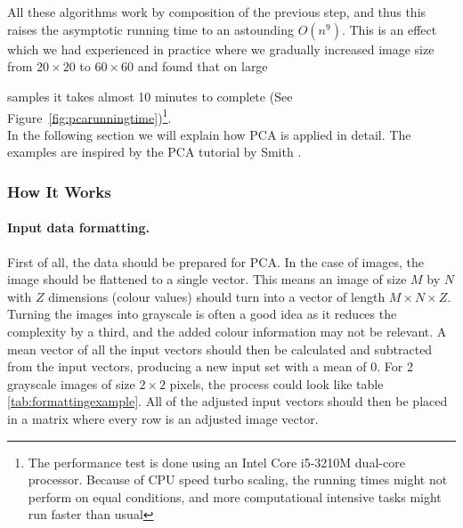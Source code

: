\begin{minipage}{\linewidth}
\centering
{}
\label{fig:pcarunningtime}
\end{minipage}\\\\

All these algorithms work by composition of the previous step, and thus this raises the asymptotic running time to an astounding $\mathit{O}(n^9)$.
This is an effect which we had experienced in practice where we gradually increased image size from $20 \times 20$ to $60 \times 60$ and found that on large

samples it takes almost 10 minutes to complete (See Figure~\ref{fig:pcarunningtime})\footnote{The performance test is done using an Intel Core i5-3210M dual-core processor. Because of CPU speed turbo scaling, the running times might not perform on equal conditions, and more computational intensive tasks might run faster than usual}.\\


In the following section we will explain how PCA is applied in detail. The examples are inspired by the PCA tutorial by Smith \cite{smith2002tutorial}.

\subsubsection{How It Works}
\label{ssub:HowItWorks}
\paragraph{Input data formatting.}
First of all, the data should be prepared for PCA.
In the case of images, the image should be flattened to a single vector.
This means an image of size $M$ by $N$ with $Z$ dimensions (colour values) should turn into a vector of length $M\times N\times Z$.
Turning the images into grayscale is often a good idea as it reduces the complexity by a third, and the added colour information may not be relevant.
A mean vector of all the input vectors should then be calculated and subtracted from the input vectors, producing a new input set with a mean of 0.
For 2 grayscale images of size $2\times 2$ pixels, the process could look like table \ref{tab:formattingexample}.
All of the adjusted input vectors should then be placed in a matrix where every row is an adjusted image vector.

